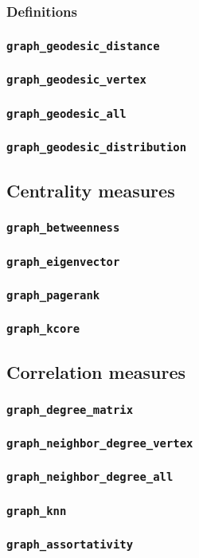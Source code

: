 \documentclass[a4paper,10pt]{article}
\begin{document}
\subsubsection{Definitions}
\subsubsection{\texttt{graph\_geodesic\_distance}}
\subsubsection{\texttt{graph\_geodesic\_vertex}}
\subsubsection{\texttt{graph\_geodesic\_all}}
\subsubsection{\texttt{graph\_geodesic\_distribution}}

\subsection{Centrality measures}
\subsubsection{\texttt{graph\_betweenness}}
\subsubsection{\texttt{graph\_eigenvector}}
\subsubsection{\texttt{graph\_pagerank}}
\subsubsection{\texttt{graph\_kcore}}

\subsection{Correlation measures}
\subsubsection{\texttt{graph\_degree\_matrix}}
\subsubsection{\texttt{graph\_neighbor\_degree\_vertex}}
\subsubsection{\texttt{graph\_neighbor\_degree\_all}}
\subsubsection{\texttt{graph\_knn}}
\subsubsection{\texttt{graph\_assortativity}}
\end{document}
